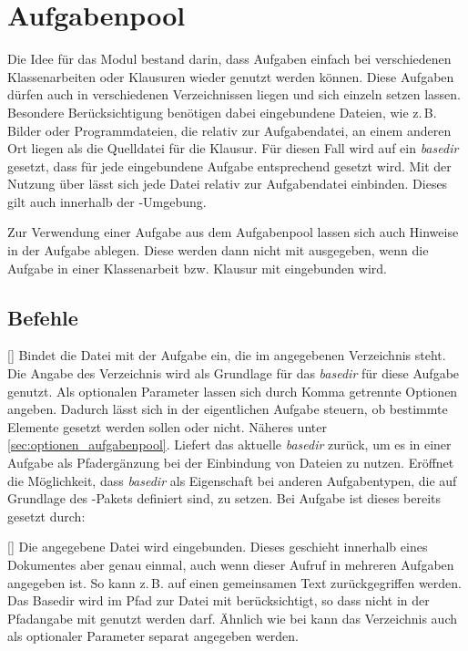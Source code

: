\section{Aufgabenpool} 
\label{modul:aufgabenpool}
Die Idee für das Modul  bestand darin, dass Aufgaben einfach bei verschiedenen Klassenarbeiten oder Klausuren wieder genutzt werden können. Diese Aufgaben dürfen auch in verschiedenen Verzeichnissen liegen und sich einzeln setzen lassen. Besondere Berücksichtigung benötigen dabei eingebundene Dateien, wie z.\,B. Bilder oder Programmdateien, die relativ zur Aufgabendatei, an einem anderen Ort liegen als die Quelldatei für die Klausur. Für diesen Fall wird auf ein \textit{basedir} gesetzt, dass für jede eingebundene Aufgabe entsprechend gesetzt wird. Mit der Nutzung über  lässt sich jede Datei relativ zur Aufgabendatei einbinden. Dieses gilt auch innerhalb der -Umgebung.

Zur Verwendung einer Aufgabe aus dem Aufgabenpool lassen sich auch Hinweise in der Aufgabe ablegen. Diese werden dann nicht mit ausgegeben, wenn die Aufgabe in einer Klassenarbeit bzw. Klausur mit eingebunden wird.

\subsection{Befehle}
\begin{commands}
    []
        Bindet die Datei mit der Aufgabe ein, die im angegebenen Verzeichnis steht. Die Angabe des Verzeichnis wird als Grundlage für das \textit{basedir} für diese Aufgabe genutzt. Als optionalen Parameter lassen sich durch Komma getrennte Optionen angeben. Dadurch lässt sich in der eigentlichen Aufgabe steuern, ob bestimmte Elemente gesetzt werden sollen oder nicht. Näheres unter \ref{sec:optionen_aufgabenpool}.
        Liefert das aktuelle \textit{basedir} zurück, um es in einer Aufgabe als Pfadergänzung bei der Einbindung von Dateien zu nutzen.
        Eröffnet die Möglichkeit, dass \textit{basedir} als Eigenschaft bei anderen Aufgabentypen, die auf Grundlage des -Pakets definiert sind, zu setzen. Bei Aufgabe ist dieses bereits gesetzt durch:
        \begin{sourcecode}[gobble=12]
        \end{sourcecode}
    []
        Die angegebene Datei wird eingebunden. Dieses geschieht innerhalb eines Dokumentes aber genau einmal, auch wenn dieser Aufruf in mehreren Aufgaben angegeben ist. So kann z.\,B. auf einen gemeinsamen Text zurückgegriffen werden. Das Basedir wird im Pfad zur Datei mit berücksichtigt, so dass  nicht in der Pfadangabe mit genutzt werden darf. Ähnlich wie bei  kann das Verzeichnis auch als optionaler Parameter separat angegeben werden.
\end{commands}

